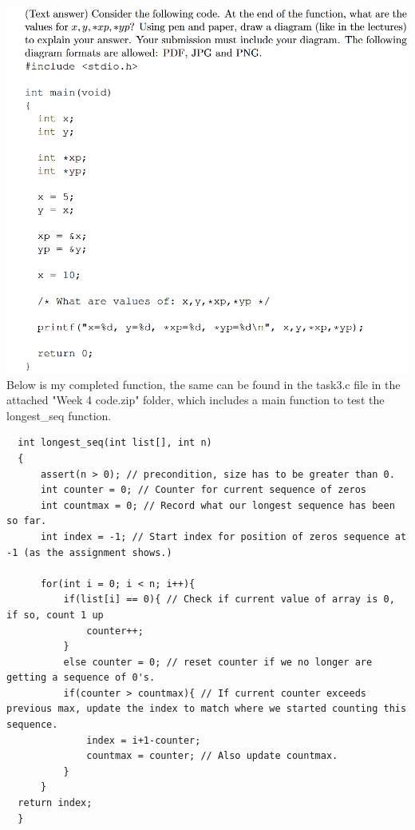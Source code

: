 \documentclass{article}
\begin{document}
\section{}
\includegraphics[width=\linewidth, keepaspectratio=true]{task3}
\vspace{2pt}\\
Below is my completed function, the same can be found in the task3.c file in the attached "Week 4 code.zip" folder, which includes a main function to test the longest\_seq function.
\begin{lstlisting}
  int longest_seq(int list[], int n) 
  {
      assert(n > 0); // precondition, size has to be greater than 0.
      int counter = 0; // Counter for current sequence of zeros
      int countmax = 0; // Record what our longest sequence has been so far.
      int index = -1; // Start index for position of zeros sequence at -1 (as the assignment shows.)
      
      for(int i = 0; i < n; i++){
          if(list[i] == 0){ // Check if current value of array is 0, if so, count 1 up
              counter++;
          }
          else counter = 0; // reset counter if we no longer are getting a sequence of 0's.
          if(counter > countmax){ // If current counter exceeds previous max, update the index to match where we started counting this sequence.
              index = i+1-counter; 
              countmax = counter; // Also update countmax.
          } 
      }
  return index;
  }
\end{lstlisting}
\end{document}
